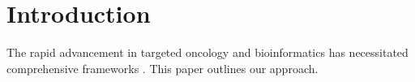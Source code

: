 \section{Introduction}
The rapid advancement in targeted oncology and bioinformatics has necessitated comprehensive frameworks \cite{smith2025oncology}. This paper outlines our approach.
